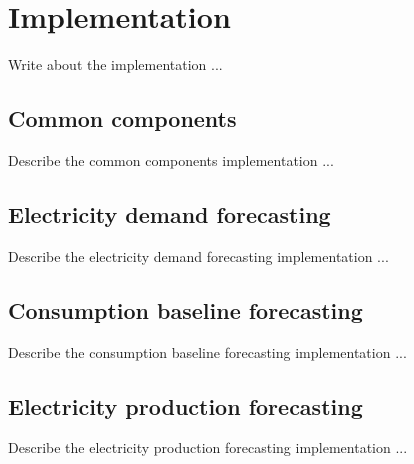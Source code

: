 \chapter{Implementation}
\label{cha:implementation}
\vspace{0.4 cm}

Write about the implementation ...


\section{Common components}
\label{sec:componentsimpl}
\vspace{0.2 cm}

Describe the common components implementation ...


\section{Electricity demand forecasting}
\label{sec:demandimpl}
\vspace{0.2 cm}

Describe the electricity demand forecasting implementation ...


\section{Consumption baseline forecasting}
\label{sec:baselineimpl}
\vspace{0.2 cm}

Describe the consumption baseline forecasting implementation ...


\section{Electricity production forecasting}
\label{sec:productionimpl}
\vspace{0.2 cm}

Describe the electricity production forecasting implementation ...
